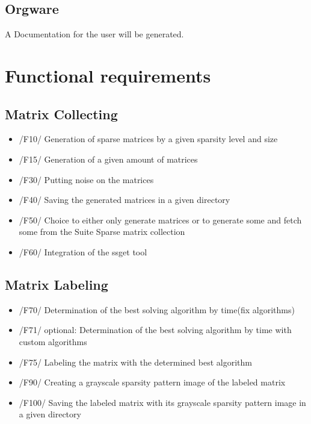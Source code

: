 \documentclass[parskip=full]{scrartcl}
\begin{document}
\subsection{Orgware}
A Documentation for the user will be generated.


\section{Functional requirements}
\subsection{Matrix Collecting}
	\begin{itemize}
	\item /F10/ Generation of sparse matrices by a given sparsity level and size
	\item /F15/ Generation of a given amount of matrices
	\item /F30/ Putting noise on the matrices
 	\item /F40/ Saving the generated matrices in a given directory
        \item /F50/ Choice to either only generate matrices or to generate some and fetch some from the \gls{Suite Sparse} matrix collection
	\item /F60/ Integration of the \gls{ssget} tool
	\end{itemize}
\subsection{Matrix Labeling}
	\begin{itemize}
	\item /F70/ Determination of the best solving \gls{algorithm} by time(fix \glspl{algorithm})
	\item /F71/ optional: Determination of the best solving \gls{algorithm} by time with custom \glspl{algorithm}
	\item /F75/ Labeling the matrix with the determined best algorithm
	\item /F90/ Creating a \gls{grayscale sparsity pattern image} of the labeled matrix
	\item /F100/ Saving the labeled matrix with its \gls{grayscale sparsity pattern image} in a given directory 
	\end{itemize}
	
	
\end{document}
